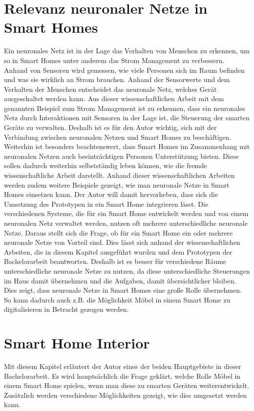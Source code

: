 \section{Relevanz neuronaler Netze in Smart Homes}
Ein neuronales Netz ist in der Lage das Verhalten von Menschen zu erkennen, um so in Smart Homes unter anderem das Strom Management zu verbessern. Anhand von Sensoren wird gemessen, wie viele Personen sich im Raum befinden und was sie wirklich an Strom brauchen. Anhand der Sensorwerte und dem Verhalten der Menschen entscheidet das neuronale Netz, welches Gerät ausgeschaltet werden kann. \citep{badlani2011smart} Aus dieser wissenschaftlichen Arbeit mit dem genannten Beispiel zum Strom Management ist zu erkennen, dass ein neuronales Netz durch Interaktionen mit Sensoren in der Lage ist, die Steuerung der smarten Geräte zu verwalten. Deshalb ist es für den Autor wichtig, sich mit der Verbindung zwischen neuronalen Netzen und Smart Homes zu beschäftigen.
\newline
Weiterhin ist besonders beachtenswert, dass Smart Homes im Zusammenhang mit neuronalen Netzen auch beeinträchtigen Personen Unterstützung bieten. Diese sollen dadurch weiterhin selbstständig leben können, wie die fremde wissenschaftliche Arbeit \citep{hussein2014smart} darstellt. 
\newline
Anhand dieser wissenschaftlichen Arbeiten werden zudem weitere Beispiele gezeigt, wie man neuronale Netze in Smart Homes einsetzen kann. Der Autor will damit hervorheben, dass sich die Umsetzung des Prototypen  in ein Smart Home integrieren lässt. Die verschiedenen Systeme, die für ein Smart Home entwickelt werden und von einem neuronalen Netz verwaltet werden, nutzen oft mehrere unterschiedliche neuronale Netze. Daraus stellt sich die Frage, ob für ein Smart Home ein oder mehrere neuronale Netze von Vorteil sind. Dies lässt sich anhand der wissenschaftlichen Arbeiten, die in diesem Kapitel ausgeführt wurden und dem Prototypen der Bachelorarbeit beantworten. Deshalb ist es besser für verschiedene Räume unterschiedliche neuronale Netze zu nutzen, da diese unterschiedliche Steuerungen im Haus damit übernehmen und die Aufgaben, damit übersichtlicher bleiben. Dies zeigt, dass neuronale Netze in Smart Homes eine große Rolle übernehmen. So kann dadurch auch z.B. die Möglichkeit Möbel in einem Smart Home zu digitalisieren in Betracht gezogen werden.

\section{Smart Home Interior}
Mit diesem Kapitel erläutert der Autor eines der beiden Hauptgebiete in dieser Bachelorarbeit. Es wird hauptsächlich die Frage geklärt, welche Rolle Möbel in einem Smart Home spielen, wenn man diese zu smarten Geräten weiterentwickelt. Zusätzlich werden verschiedene Möglichkeiten gezeigt, wie dies umgesetzt werden kann.


